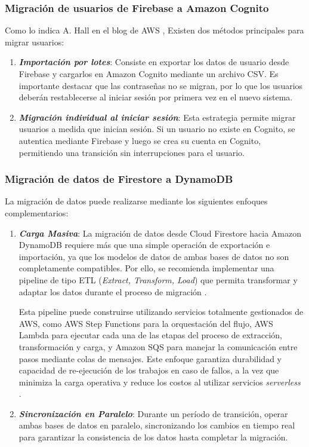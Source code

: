\subsubsection{Migración de usuarios de Firebase a Amazon Cognito}

Como lo indica A. Hall en el blog de AWS \cite{Hall2017}, Existen dos métodos principales para migrar usuarios:

\begin{enumerate}[label=\alph*)]

\item \textbf{\textit{Importación por lotes}}: Consiste en exportar los datos de usuario desde Firebase y cargarlos en Amazon Cognito mediante un archivo CSV. Es importante destacar que las contraseñas no se migran, por lo que los usuarios deberán restablecerse al iniciar sesión por primera vez en el nuevo sistema.

\item \textbf{\textit{Migración individual al iniciar sesión}}: Esta estrategia permite migrar usuarios a medida que inician sesión. Si un usuario no existe en Cognito, se autentica mediante Firebase y luego se crea su cuenta en Cognito, permitiendo una transición sin interrupciones para el usuario.
\end{enumerate}

\subsubsection{Migración de datos de Firestore a DynamoDB}

La migración de datos puede realizarse mediante los siguientes enfoques complementarios:

\begin{enumerate}[label=\alph*)]
\item \textbf{\textit{Carga Masiva}}: La migración de datos desde Cloud Firestore hacia Amazon DynamoDB requiere más que una simple operación de exportación e importación, ya que los modelos de datos de ambas bases de datos no son completamente compatibles. Por ello, se recomienda implementar una pipeline de tipo ETL (\textit{Extract, Transform, Load}) que permita transformar y adaptar los datos durante el proceso de migración \cite{Michael2021}.

\hfill

Esta pipeline puede construirse utilizando servicios totalmente gestionados de AWS, como AWS Step Functions para la orquestación del flujo, AWS Lambda para ejecutar cada una de las etapas del proceso de extracción, transformación y carga, y Amazon SQS para manejar la comunicación entre pasos mediante colas de mensajes. Este enfoque garantiza durabilidad y capacidad de re-ejecución de los trabajos en caso de fallos, a la vez que minimiza la carga operativa y reduce los costos al utilizar servicios \textit{serverless} \cite{Michael2021}.

\item \textbf{\textit{Sincronización en Paralelo}}: Durante un período de transición, operar ambas bases de datos en paralelo, sincronizando los cambios en tiempo real para garantizar la consistencia de los datos hasta completar la migración.
\end{enumerate}


